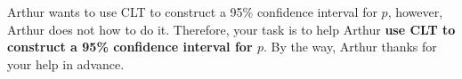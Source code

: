 \documentclass[10pt,letterpaper]{article}
\theoremstyle{definition}
\numberwithin{equation}{section}
\begin{document}
\begin{enumerate}[I]
\begin{enumerate}
    Arthur wants to use CLT to construct a 95\% confidence interval for $p$, however, Arthur does not how to do it. Therefore, your task is to help Arthur \textbf{use CLT to construct a 95\% confidence interval for $p$}. By the way, Arthur thanks for your help in advance.
    
    
	
	
	
\end{enumerate}





\end{enumerate}
\end{document}
